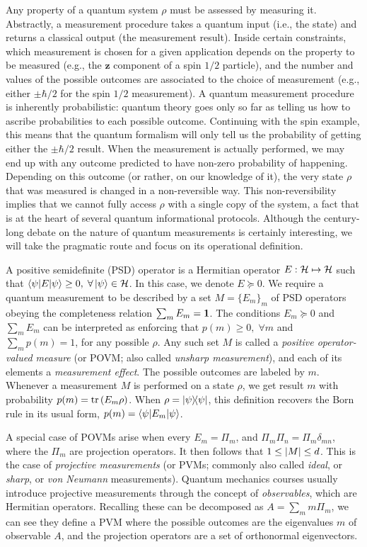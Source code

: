 		Any property of a quantum system $\rho$ must be assessed by measuring it. Abstractly, a measurement procedure takes a quantum input (i.e., the state) and returns a classical output (the measurement result). Inside certain constraints, which measurement is chosen for a given application depends on the property to be measured (e.g., the $\mathbf{z}$ component of a spin $1/2$ particle), and the number and values of the possible outcomes are associated to the choice of measurement (e.g., either $\pm \hbar/2$ for the spin $1/2$ measurement). A quantum measurement procedure is inherently probabilistic: quantum theory goes only so far as telling us how to ascribe probabilities to each possible outcome. Continuing with the spin example, this means that the quantum formalism will only tell us the probability of getting either the $\pm \hbar/2$ result. When the measurement is actually performed, we may end up with any outcome predicted to have non-zero probability of happening. Depending on this outcome (or rather, on our knowledge of it), the very state $\rho$ that was measured is changed in a non-reversible way. This non-reversibility implies that we cannot fully access $\rho$ with a single copy of the system, a fact that is at the heart of several quantum informational protocols. Although the century-long debate on the nature of quantum measurements is certainly interesting, we will take the pragmatic route and focus on its operational definition.
		
		A positive semidefinite (PSD) operator is a Hermitian operator $E : \mathcal{H} \mapsto \mathcal{H}$ such that $\left\langle \psi \middle\vert E \middle\vert \psi \right\rangle \geq 0, \;\forall \ket{\psi} \in \mathcal{H}$. In this case, we denote $E \succeq 0$. We require a quantum measurement to be described by a set $M = \{ E_m \}_m$ of PSD operators obeying the completeness relation $\sum_m E_m = \mathbf{1}$. The conditions $E_m \succeq 0$ and $\sum_m E_m$ can be interpreted as enforcing that $p(m) \geq 0, \;\forall m$ and $\sum_m p(m) = 1$, for any possible $\rho$. Any such set $M$ is called a \emph{positive operator-valued measure} (or POVM; also called \emph{unsharp measurement}), and each of its elements a \emph{measurement effect}. The possible outcomes are labeled by $m$. Whenever a measurement $M$ is performed on a state $\rho$, we get result $m$ with probability $p(m) = \text{tr}\left( E_m \rho \right)$. When $\rho = \ketbra{\psi}{\psi}$, this definition recovers the Born rule in its usual form, $p(m) = \left\langle \psi \middle\vert E_m \middle\vert \psi \right\rangle$.
		
		A special case of POVMs arise when every $E_m = \Pi_m$, and $\Pi_m \Pi_n = \Pi_m \delta_{mn}$, where the $\Pi_m$ are projection operators. It then follows that $1 \leq \abs{M} \leq d$. This is the case of \emph{projective measurements} (or PVMs; commonly also called \emph{ideal}, or \emph{sharp}, or \emph{von Neumann} measurements). Quantum mechanics courses usually introduce projective measurements through the concept of \emph{observables}, which are Hermitian operators. Recalling these can be decomposed as $A = \sum_m m \Pi_m$, we can see they define a PVM where the possible outcomes are the eigenvalues $m$ of observable $A$, and the projection operators are a set of orthonormal eigenvectors.
		
